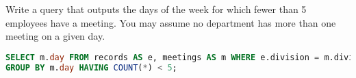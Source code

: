\question Write a query that outputs the days of the week for which fewer than 5
employees have a meeting. You may assume no department has more than one meeting on a given day.
\begin{solution}[1.5in]
\begin{lstlisting}[language=SQL]
SELECT m.day FROM records AS e, meetings AS m WHERE e.division = m.division 
GROUP BY m.day HAVING COUNT(*) < 5;
\end{lstlisting}
\end{solution}
